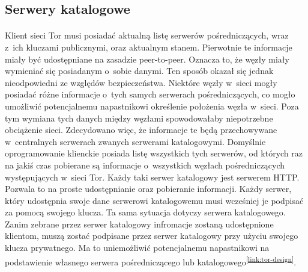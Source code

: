 \subsection{Serwery katalogowe}\paragraph{}
Klient sieci Tor musi posiadać aktualną listę serwerów pośredniczących, wraz z~ich kluczami publicznymi, oraz aktualnym stanem. Pierwotnie te informacje miały być udostępniane na zasadzie peer-to-peer. Oznacza to, że węzły miały wymieniać się posiadanym o~sobie danymi. Ten sposób okazał się jednak nieodpowiedni ze względów bezpieczeństwa. Niektóre węzły w~sieci mogły posiadać różne informacje o~tych samych serwerach pośredniczących, co mogło umożliwić potencjalnemu napastnikowi określenie położenia węzła w~sieci. Poza tym wymiana tych danych między węzłami spowodowałaby niepotrzebne obciążenie sieci. Zdecydowano więc, że informacje te będą przechowywane w~centralnych serwerach zwanych serwerami katalogowymi. Domyślnie oprogramowanie klienckie posiada listę wszystkich tych serwerów, od których raz na jakiś czas pobierane są informacje o~wszystkich węzłach pośredniczących występujących w~sieci Tor. Każdy taki serwer katalogowy jest serwerem HTTP. Pozwala to na proste udostępnianie oraz pobieranie informacji. Każdy serwer, który udostępnia swoje dane serwerowi katalogowemu musi wcześniej je podpisać za pomocą swojego klucza. Ta sama sytuacja dotyczy serwera katalogowego. Zanim zebrane przez serwer katalogowy infromacje zostaną udostępnione klientom, muszą zostać podpisane przez serwer katalogowy przy użyciu swojego klucza prywatnego. Ma to uniemożliwić potencjalnemu napastnikowi na podstawienie własnego serwera pośredniczącego lub katalogowego\textsuperscript{\ref{link:tor-design}}.
